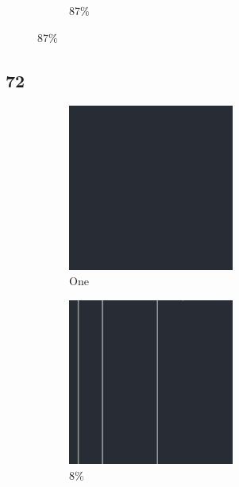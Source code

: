 \documentclass[12pt, fleqn]{report}                             %
\theoremstyle{break}                                            %
\begin{document}
\begin{figure}[ht!]
\begin{subfigure}[b]{0.4\linewidth}
          \caption{87\%}
        \end{subfigure}
      \end{figure}


      \clearpage
      \subsection{72}
      \begin{figure}[ht!]
        \centering
        \begin{subfigure}[b]{0.4\linewidth}
          \includegraphics[width=0.6\textwidth]{Images/72/a.png}
          \caption{One}
        \end{subfigure}
        \begin{subfigure}[b]{0.4\linewidth}
          \includegraphics[width=0.6\textwidth]{Images/72/b.png}
          \caption{8\%}
        \end{subfigure}
        \begin{subfigure}[b]{0.4\linewidth}

\end{subfigure}
\end{figure}
\end{document}
